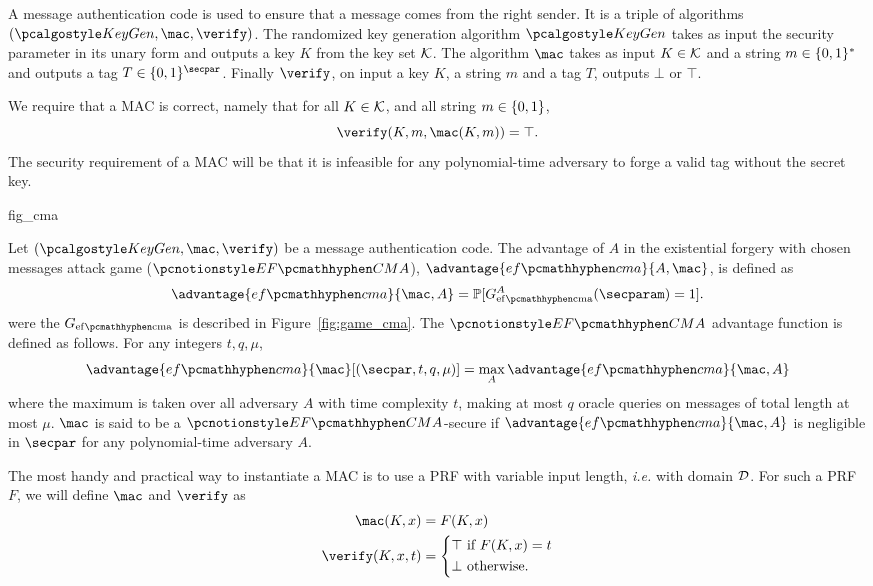 A message authentication code is used to ensure that a message comes from the right sender.
It is a triple of algorithms $(\KeyGen, \mac, \verify)$.
The randomized key generation algorithm $\KeyGen$ takes as input the security parameter in its unary form and outputs a key $K$ from the key set $\mathcal{K}$.
The algorithm $\mac$ takes as input $K \in \mathcal{K}$ and a string $m \in \{0,1\}^*$ and outputs a tag $T \in \zo^{\secpar}$.
Finally $\verify$, on input a key $K$, a string $m$ and a tag $T$, outputs $\bot$ or $\top$.

We require that a MAC is correct, namely that for all $K \in \mathcal{K}$, and all string $m \in \{0,1\}$,
\[
	\verify(K,m,\MAC(K,m)) = \top.
\]
The security requirement of a MAC will be that it is infeasible for any polynomial-time adversary to forge a valid tag without the secret key.

{fig_cma}

\begin{definition}
	\label{def:uf_cma}
	
	Let $(\KeyGen, \MAC, \verify)$ be a message authentication code.
	The advantage of $A$ in the existential forgery with chosen messages attack game ($\EFCMA$), $\advantage{\efcma}{A, \MAC}$, is defined as
	\[
		\advantage{\efcma}{\MAC,A} = \Prob[G_{\subgamestyle{\efcma}}^A(\secparam) = 1].
	\]
	were the $G_{\subgamestyle{\efcma}}$ is described in Figure~\ref{fig:game_cma}.
	The $\EFCMA$ advantage function is defined as follows. For any integers $t,q, \mu$,
	\[
		\advantage{\efcma}{\MAC}[(\secpar, t, q, \mu)] = \max_{A} \advantage{\efcma}{\mac, A}
	\]
	where the maximum is taken over all adversary $A$ with time complexity $t$, making at most $q$ oracle queries on messages of total length at most $\mu$.
	$\mac$ is said to be a $\EFCMA$-secure if $\advantage{\efcma}{\mac, A}$ is negligible in $\secpar$ for any polynomial-time adversary $A$.	
\end{definition}

The most handy and practical way to instantiate a MAC is to use a PRF with variable input length, \emph{i.e.} with domain $\mathcal{D}$.
For such a PRF $F$, we will define $\MAC$ and $\verify$ as
\begin{align*}
	\MAC(K,x) &= F(K,x) \\
	\verify(K,x,t) &=
		\left \{
		\begin{aligned}
			\top & \text{ if } F(K,x) = t \\
			\bot & \text{ otherwise.}
		\end{aligned}
		\right.
\end{align*}


